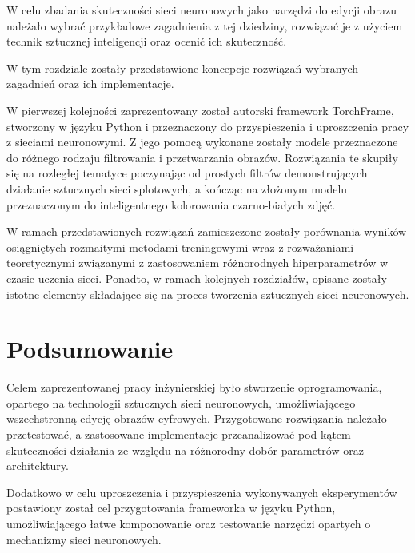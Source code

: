 \documentclass[10pt, a4paper, twoside]{article}
\begin{document}
  W celu zbadania skuteczności sieci neuronowych jako narzędzi do edycji obrazu
  należało wybrać przykładowe zagadnienia z tej dziedziny, rozwiązać je z
  użyciem technik sztucznej inteligencji oraz ocenić ich skuteczność.

  W tym rozdziale zostały przedstawione koncepcje rozwiązań wybranych zagadnień
  oraz ich implementacje.

  W pierwszej kolejności zaprezentowany został autorski framework TorchFrame,
  stworzony w języku Python i przeznaczony do przyspieszenia i uproszczenia
  pracy z sieciami neuronowymi. Z jego pomocą wykonane zostały modele przeznaczone
  do różnego rodzaju filtrowania i przetwarzania obrazów. Rozwiązania te
  skupiły się na rozległej tematyce poczynając od prostych filtrów demonstrujących
  działanie sztucznych sieci splotowych, a kończąc na złożonym modelu przeznaczonym do
  inteligentnego kolorowania czarno-białych zdjęć.

  W ramach przedstawionych rozwiązań zamieszczone zostały porównania wyników
  osiągniętych rozmaitymi metodami treningowymi wraz z rozważaniami teoretycznymi
  związanymi z zastosowaniem różnorodnych hiperparametrów w czasie uczenia sieci.
  Ponadto, w ramach kolejnych rozdziałów, opisane zostały istotne
  elementy składające się na proces tworzenia sztucznych sieci neuronowych.

  

  

  

\section{Podsumowanie}

  Celem zaprezentowanej pracy inżynierskiej było stworzenie oprogramowania,
  opartego na technologii sztucznych sieci neuronowych, umożliwiającego
  wszechstronną edycję obrazów cyfrowych. Przygotowane rozwiązania należało
  przetestować, a zastosowane implementacje przeanalizować pod kątem
  skuteczności działania ze względu na różnorodny dobór parametrów oraz
  architektury.

  Dodatkowo w celu uproszczenia i przyspieszenia wykonywanych eksperymentów
  postawiony został cel przygotowania frameworka w języku Python, umożliwiającego
  łatwe komponowanie oraz testowanie narzędzi opartych o mechanizmy sieci
  neuronowych.




\end{document}
